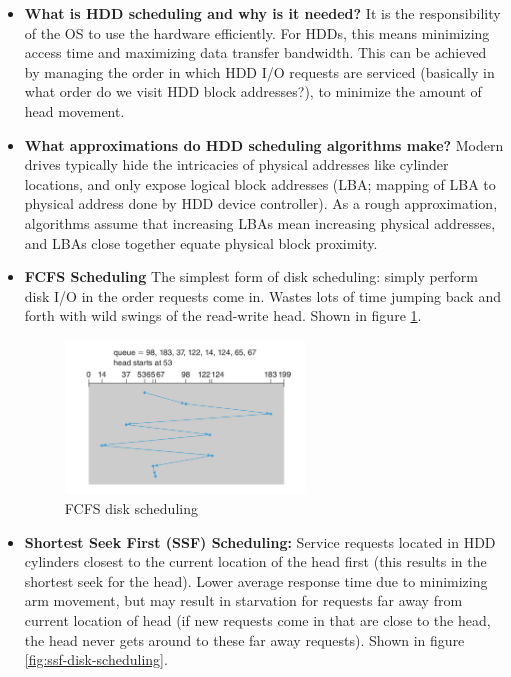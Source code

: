 \documentclass[12pt]{article}
\begin{document}
\begin{itemize}
    \item \textbf{What is HDD scheduling and why is it needed?} It is the responsibility of the OS to use the hardware efficiently. For HDDs, this means minimizing access time and maximizing data transfer bandwidth. This can be achieved by managing the order in which HDD I/O requests are serviced (basically in what order do we visit HDD block addresses?), to minimize the amount of head movement.
    \item \textbf{What approximations do HDD scheduling algorithms make?} Modern drives typically hide the intricacies of physical addresses like cylinder locations, and only expose logical block addresses (LBA; mapping of LBA to physical address done by HDD device controller). As a rough approximation, algorithms assume that increasing LBAs mean increasing physical addresses, and LBAs close together equate physical block proximity.
    \item \textbf{FCFS Scheduling} The simplest form of disk scheduling: simply perform disk I/O in the order requests come in. Wastes lots of time jumping back and forth with wild swings of the read-write head. Shown in figure \ref{fig:fcfs-disk-scheduling}.
        \begin{figure}[ht]
            \centering
            \includegraphics[width=0.6\textwidth]{figures/fcfs-disk-scheduling.jpg}
            \caption{FCFS disk scheduling}
            \label{fig:fcfs-disk-scheduling}
        \end{figure}
    \item \textbf{Shortest Seek First (SSF) Scheduling:} Service requests located in HDD cylinders closest to the current location of the head first (this results in the shortest seek for the head). Lower average response time due to minimizing arm movement, but may result in starvation for requests far away from current location of head (if new requests come in that are close to the head, the head never gets around to these far away requests). Shown in figure \ref{fig:ssf-disk-scheduling}.

\end{itemize}
\end{document}
